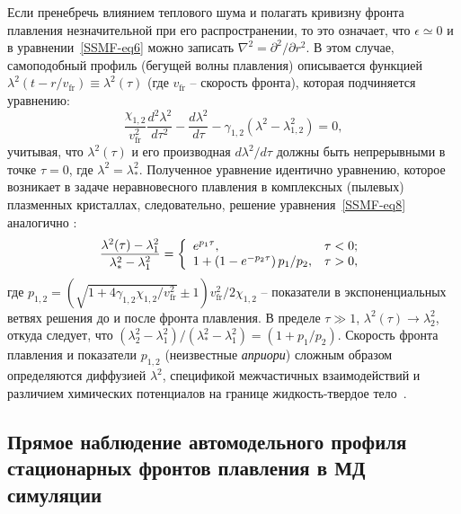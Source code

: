 Если пренебречь влиянием теплового шума и полагать кривизну фронта плавления незначительной при его распространении, то это означает, что $ \epsilon \simeq 0 $ и в уравнении~\eqref{SSMF-eq6} можно записать $ \nabla ^ 2 = \partial ^ 2 / \partial r ^ 2 $.
В этом случае, самоподобный профиль (бегущей волны плавления) описывается функцией $\lambda^2(t-r/v_\mathrm{fr})\equiv \lambda^2(\tau)$ (где $v_\mathrm{fr}$ -- скорость фронта), которая подчиняется уравнению:
\begin{equation}
  \label{SSMF-eq8}
  \frac{\chi_{1,2}}{v_{\mathrm{fr}}^2} \frac{d^2 \lambda^2}{d\tau^2} -\frac{d \lambda^2}{d \tau} -\gamma_{1,2}(\lambda^2-\lambda_{1,2}^2) =0,
\end{equation}
учитывая, что $\lambda^2(\tau) $ и его производная $ d\lambda^2/ d \tau $ должны быть непрерывными в точке $ \tau = 0 $, где $\lambda^2=\lambda_\ast^2$.
Полученное уравнение идентично уравнению, которое возникает в задаче неравновесного плавления в комплексных (пылевых) плазменных кристаллах, следовательно, решение уравнения~\eqref{SSMF-eq8} аналогично \cite{10.1103/physreve.96.043201, 10.1103/physreve.100.023203}:
\begin{equation}
  \label{SSMF-eq9}
  \frac{\lambda^2(\tau)-\lambda^2_1}{\lambda^2_\ast-\lambda^2_1}=
  \left\{
  \begin{array}{ll}
    e^{p_1 \tau},                          & \tau < 0; \\
    1+\left(1-e^{-p_2\tau}\right)p_1/p_2 , & \tau > 0, \\
  \end{array}
  \right. \\
\end{equation}
где $ p_{1,2} = \left(\sqrt {1 + 4 \gamma_{1,2} \chi_{1,2} / v_\mathrm{fr} ^ 2} \pm 1 \right) v_\mathrm{fr} ^ 2/2 \chi_{1,2} $ -- показатели в экспоненциальных ветвях решения до и после фронта плавления.
В пределе $\tau \gg 1$, $\lambda^2(\tau) \rightarrow \lambda_2^2$, откуда следует, что
$\left(\lambda_2^2-\lambda^2_1\right)/\left(\lambda^2_\ast-\lambda^2_1\right) = (1+p_1/p_2)$.
Скорость фронта плавления и показатели $p_{1,2} $ (неизвестные \emph{априори}) сложным образом определяются диффузией $\lambda^2$, спецификой межчастичных взаимодействий и различием химических потенциалов на границе жидкость-твердое тело~\cite{10.1038/ncomms7942}.


\subsection{Прямое наблюдение автомодельного профиля стационарных фронтов плавления в МД симуляции}
\label{SSMF-Results-MD}


